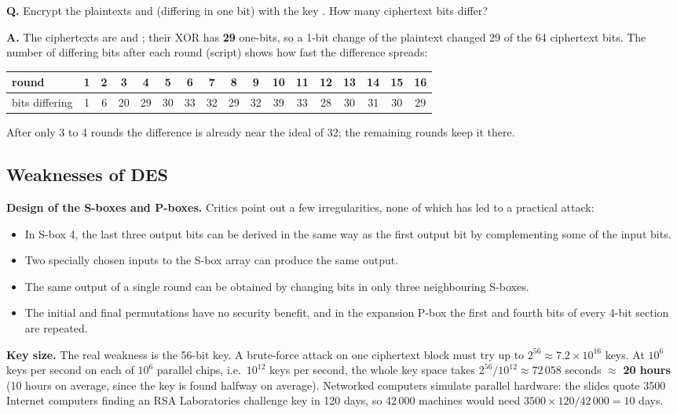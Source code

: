\begin{worked}
\textbf{Q.} Encrypt the plaintexts  and  (differing in one bit) with the key . How many ciphertext bits differ?

\textbf{A.} The ciphertexts are  and ; their XOR has \textbf{29} one-bits, so a 1-bit change of the plaintext changed 29 of the 64 ciphertext bits. The number of differing bits after each round (script) shows how fast the difference spreads:
\begin{center}\small\setlength{\tabcolsep}{3.4pt}
\begin{tabular}{@{}l*{16}{c}@{}}
\toprule
round & 1&2&3&4&5&6&7&8&9&10&11&12&13&14&15&16\\
\midrule
bits differing & 1&6&20&29&30&33&32&29&32&39&33&28&30&31&30&29\\
\bottomrule
\end{tabular}
\end{center}
After only 3 to 4 rounds the difference is already near the ideal of 32; the remaining rounds keep it there.
\end{worked}

\subsection{Weaknesses of DES \hot}
\textbf{Design of the S-boxes and P-boxes.} Critics point out a few irregularities, none of which has led to a practical attack:
\begin{itemize}
  \item In S-box 4, the last three output bits can be derived in the same way as the first output bit by complementing some of the input bits.
  \item Two specially chosen inputs to the S-box array can produce the same output.
  \item The same output of a single round can be obtained by changing bits in only three neighbouring S-boxes.
  \item The initial and final permutations have no security benefit, and in the expansion P-box the first and fourth bits of every 4-bit section are repeated.
\end{itemize}

\textbf{Key size.} The real weakness is the 56-bit key. A brute-force attack on one ciphertext block must try up to $2^{56} \approx 7.2 \times 10^{16}$ keys. At $10^6$ keys per second on each of $10^6$ parallel chips, i.e.\ $10^{12}$ keys per second, the whole key space takes $2^{56}/10^{12} \approx 72\,058$ seconds $\approx$ \textbf{20 hours} (10 hours on average, since the key is found halfway on average). Networked computers simulate parallel hardware: the slides quote 3500 Internet computers finding an RSA Laboratories challenge key in 120 days, so 42\,000 machines would need $3500 \times 120 / 42\,000 = 10$ days.

